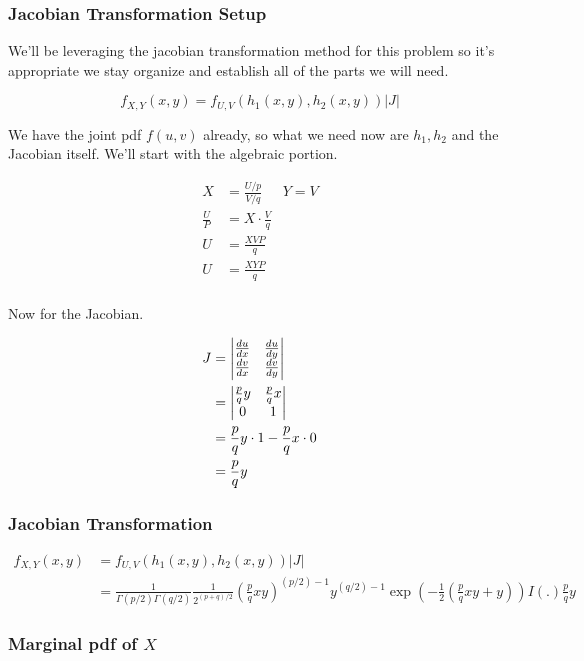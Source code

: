 \subsubsection*{Jacobian Transformation Setup}

We'll be leveraging the jacobian transformation method for this problem so it's appropriate we stay organize and establish all of the parts we will need.

\[
	f_{X,Y}(x,y) = f_{U,V}(h_1(x,y), h_2(x,y)) |J|
\]

We have the joint pdf $f(u,v)$ already, so what we need now are $h_1, h_2$ and the Jacobian itself. We'll start with the algebraic portion.

\begin{align*}
	X &= \frac{U/p}{V/q} & Y=V \\
	\frac{U}{P} &= X \cdot \frac{V}{q} \\
	U &= \frac{XVP}{q} \\
	U &= \frac{XYP}{q} \\
\end{align*}

Now for the Jacobian.

\begin{align*}
	J &= \m{v}{\frac{du}{dx} & \frac{du}{dy} \\ \frac{dv}{dx} & \frac{dv}{dy}} \\
	&= \m{v}{\frac{p}{q} y & \frac{p}{q} x \\  0 & 1 } \\
	&= \frac{p}{q} y \cdot 1 - \frac{p}{q} x \cdot 0 \\ 
	&= \frac{p}{q} y
\end{align*}

\subsubsection*{Jacobian Transformation}

\begin{align*}
	f_{X,Y}(x,y) &= f_{U,V}(h_1(x,y), h_2(x,y)) |J| \\
	&= \frac{1}{\Gamma(p/2)\Gamma(q/2)} 
	\frac{1}{2^{(p+q)/2}} 
	\left( \frac{p}{q}xy \right)^{(p/2)-1} 
	y^{(q/2)-1} 
	\exp\left( -\frac{1}{2} \left( \frac{p}{q}xy + y \right) \right) 
	I(.) \frac{p}{q}y
\end{align*}

\subsubsection*{Marginal pdf of $X$}

